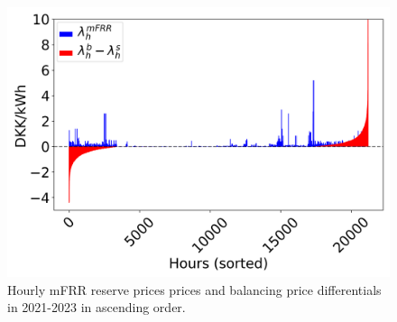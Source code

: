 \documentclass[sigconf]{acmart}
\begin{document}
\begin{figure}[t]
    \centering
    \includegraphics[width=\columnwidth]{figures/mfrr_prices.png}
    \caption{Hourly mFRR reserve prices prices and balancing price differentials in 2021-2023 in ascending order.}
    \label{fig:mfrr_prices_2022}
\end{figure}
\end{document}
